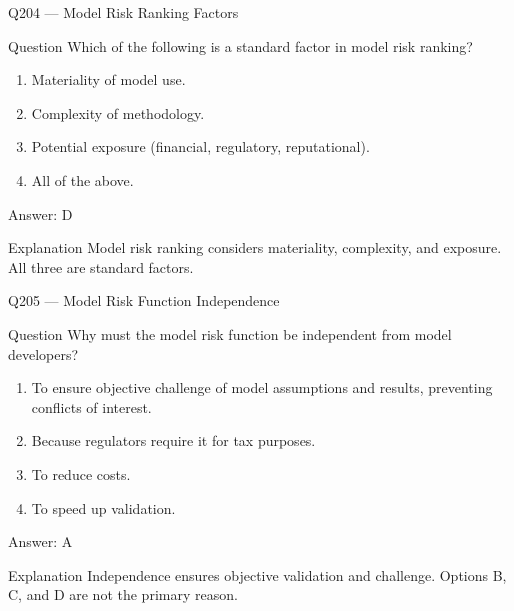 \documentclass[aspectratio=169,8pt]{beamer}
\begin{document}
											\begin{frame}{Q204 --- Model Risk Ranking Factors}
												\begin{block}{Question}
													Which of the following is a standard factor in model risk ranking?
													\begin{enumerate}
														\item Materiality of model use.
														\item Complexity of methodology.
														\item Potential exposure (financial, regulatory, reputational).
														\item All of the above.
													\end{enumerate}  \end{block}
													\begin{exampleblock}{Answer: D}\end{exampleblock}
													\begin{block}{Explanation}
														Model risk ranking considers materiality, complexity, and exposure. All three are standard factors.
													\end{block}
												\end{frame}
												
												\begin{frame}{Q205 --- Model Risk Function Independence}
													\begin{block}{Question}
														Why must the model risk function be independent from model developers?
														\begin{enumerate}
															\item To ensure objective challenge of model assumptions and results, preventing conflicts of interest.
															\item Because regulators require it for tax purposes.
															\item To reduce costs.
															\item To speed up validation.
														\end{enumerate}  \end{block}
														\begin{exampleblock}{Answer: A}\end{exampleblock}
														\begin{block}{Explanation}
															Independence ensures objective validation and challenge. Options B, C, and D are not the primary reason.
														\end{block}
													\end{frame}
													
\end{document}
